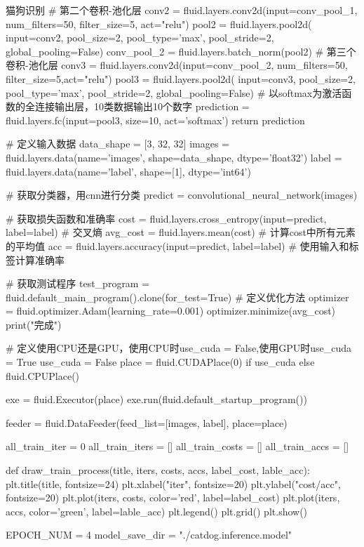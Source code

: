 \documentclass[openbib]{article}
\begin{document}
\begin{Python}{猫狗识别}
	# 第二个卷积-池化层
	conv2 = fluid.layers.conv2d(input=conv_pool_1,
								num_filters=50,
								filter_size=5,
								act="relu")
	pool2 = fluid.layers.pool2d(
								input=conv2,
								pool_size=2,
								pool_type='max',
								pool_stride=2,
								global_pooling=False)
	conv_pool_2 = fluid.layers.batch_norm(pool2)
	# 第三个卷积-池化层
	conv3 = fluid.layers.conv2d(input=conv_pool_2, num_filters=50, 				filter_size=5,act="relu")
	pool3 = fluid.layers.pool2d(
								input=conv3,
								pool_size=2,
								pool_type='max',
								pool_stride=2,
								global_pooling=False)
	# 以softmax为激活函数的全连接输出层，10类数据输出10个数字
	prediction = fluid.layers.fc(input=pool3,
								size=10,
								act='softmax')
	return prediction

# 定义输入数据
data_shape = [3, 32, 32]
images = fluid.layers.data(name='images', shape=data_shape, dtype='float32')
label = fluid.layers.data(name='label', shape=[1], dtype='int64')

# 获取分类器，用cnn进行分类
predict = convolutional_neural_network(images)

# 获取损失函数和准确率
cost = fluid.layers.cross_entropy(input=predict, label=label)  # 交叉熵
avg_cost = fluid.layers.mean(cost)  # 计算cost中所有元素的平均值
acc = fluid.layers.accuracy(input=predict, label=label)  # 使用输入和标签计算准确率

# 获取测试程序
test_program = fluid.default_main_program().clone(for_test=True)
# 定义优化方法
optimizer = fluid.optimizer.Adam(learning_rate=0.001)
optimizer.minimize(avg_cost)
print("完成")


# 定义使用CPU还是GPU，使用CPU时use_cuda = False,使用GPU时use_cuda = True
use_cuda = False
place = fluid.CUDAPlace(0) if use_cuda else fluid.CPUPlace()

exe = fluid.Executor(place)
exe.run(fluid.default_startup_program())

feeder = fluid.DataFeeder(feed_list=[images, label], place=place)

all_train_iter = 0
all_train_iters = []
all_train_costs = []
all_train_accs = []


def draw_train_process(title, iters, costs, accs, label_cost, lable_acc):
	plt.title(title, fontsize=24)
	plt.xlabel("iter", fontsize=20)
	plt.ylabel("cost/acc", fontsize=20)
	plt.plot(iters, costs, color='red', label=label_cost)
	plt.plot(iters, accs, color='green', label=lable_acc)
	plt.legend()
	plt.grid()
	plt.show()


EPOCH_NUM = 4
model_save_dir = "./catdog.inference.model"


\end{Python}
\end{document}
